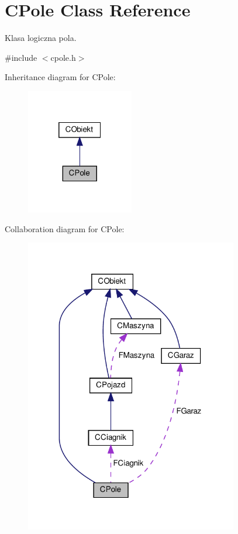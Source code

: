\hypertarget{class_c_pole}{}\section{C\+Pole Class Reference}
\label{class_c_pole}


Klasa logiczna pola.  




{\ttfamily \#include $<$cpole.\+h$>$}



Inheritance diagram for C\+Pole\+:\nopagebreak
\begin{figure}[H]
\begin{center}
\leavevmode
\includegraphics[width=133pt]{class_c_pole__inherit__graph}
\end{center}
\end{figure}


Collaboration diagram for C\+Pole\+:\nopagebreak
\begin{figure}[H]
\begin{center}
\leavevmode
\includegraphics[width=263pt]{class_c_pole__coll__graph}
\end{center}
\end{figure}
